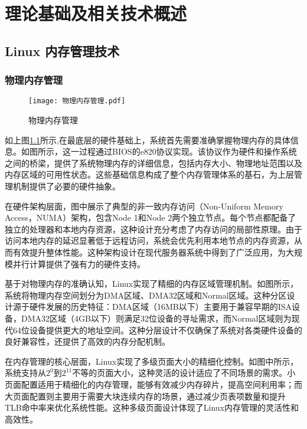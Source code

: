 \chapter{理论基础及相关技术概述}



\section{Linux 内存管理技术}

\subsection{物理内存管理}


\begin{figure}[h]
    \texttt{[image: 物理内存管理.pdf]}
    \caption{物理内存管理}
    \label{物理内存管理}
\end{figure}



如上图\ref{物理内存管理}所示,在最底层的硬件基础上，系统首先需要准确掌握物理内存的具体信息。如图所示，这一过程通过BIOS的e820协议实现。该协议作为硬件和操作系统之间的桥梁，提供了系统物理内存的详细信息，包括内存大小、物理地址范围以及内存区域的可用性状态。这些基础信息构成了整个内存管理体系的基石，为上层管理机制提供了必要的硬件抽象。

在硬件架构层面，图中展示了典型的非一致内存访问（Non-Uniform Memory Access，NUMA）架构，包含Node 1和Node 2两个独立节点。每个节点都配备了独立的处理器和本地内存资源，这种设计充分考虑了内存访问的局部性原理。由于访问本地内存的延迟显著低于远程访问，系统会优先利用本地节点的内存资源，从而有效提升整体性能。这种架构设计在现代服务器系统中得到了广泛应用，为大规模并行计算提供了强有力的硬件支持。

基于对物理内存的准确认知，Linux实现了精细的内存区域管理机制。如图所示，系统将物理内存空间划分为DMA区域、DMA32区域和Normal区域。这种分区设计源于硬件发展的历史特征：DMA区域（16MB以下）主要用于兼容早期的ISA设备，DMA32区域（4GB以下）则满足32位设备的寻址需求，而Normal区域则为现代64位设备提供更大的地址空间。这种分层设计不仅确保了系统对各类硬件设备的良好兼容性，还提供了高效的内存分配机制。

在内存管理的核心层面，Linux实现了多级页面大小的精细化控制。如图中所示，系统支持从$2^0$到$2^{11}$不等的页面大小，这种灵活的设计适应了不同场景的需求。小页面配置适用于精细化的内存管理，能够有效减少内存碎片，提高空间利用率；而大页面配置则主要用于需要大块连续内存的场景，通过减少页表项数量和提升TLB命中率来优化系统性能。这种多级页面设计体现了Linux内存管理的灵活性和高效性。

